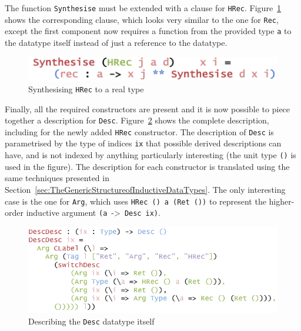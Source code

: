 \documentclass{ituthesis}
\newcommand{\ttconstructor}[1]{\textcolor{constructor-color}{\texttt{#1}}}
\newcommand{\tttype}[1]{\textcolor{type-color}{\texttt{#1}}}
\newcommand{\ttdec}[1]{\textcolor{declared-var-color}{\texttt{#1}}}
\newcommand{\ttvar}[1]{\textcolor{local-var-color}{\texttt{#1}}}
\theoremstyle{break}
\begin{document}
The function \ttdec{Synthesise} must be extended with a clause for \ttconstructor{HRec}. Figure~\ref{fig:synthhrec} shows the corresponding clause,
which looks very similar to the one for \ttconstructor{Rec}, except the first component now requires a function from the provided type \ttvar{a} to the datatype itself instead of just a reference
to the datatype.

\begin{figure}[ht]
\begin{center}
    \includegraphics[scale=0.5]{Figures/SynthesisingDataExtended.png}
\end{center}
\caption{Synthesising \ttconstructor{HRec} to a real type}
\label{fig:synthhrec}
\end{figure}

Finally, all the required constructors are present and it is now possible to piece together a description for \tttype{Desc}. Figure~\ref{fig:descdesc} shows the complete description, including for the newly added
\ttconstructor{HRec} constructor. The description of \tttype{Desc} is parametrised by the type of indices \ttvar{ix} that possible derived descriptions can have, and is not indexed by anything particularly interesting (the unit type \tttype{()} is used in the figure).
The description for each constructor is translated using the same techniques presented in Section~\ref{sec:TheGenericStructureofInductiveDataTypes}. The only interesting case is the one for \ttconstructor{Arg}, which uses \ttconstructor{HRec ()}~\ttvar{a}~\texttt{(}\ttconstructor{Ret ()}\texttt{)} to represent the higher-order inductive argument \texttt{(}\ttvar{a}~->~\tttype{Desc}~\ttvar{ix}\texttt{)}.

\begin{figure}[ht]
\begin{center}
    \includegraphics[scale=0.5]{Figures/DescriptionDescription.png}
\end{center}
\caption{Describing the \tttype{Desc} datatype itself}
\label{fig:descdesc}
\end{figure}
\end{document}
